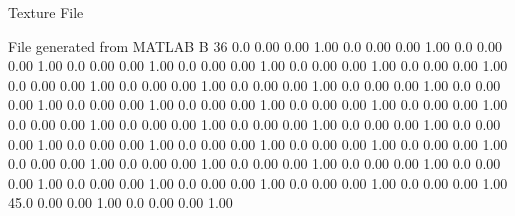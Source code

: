 Texture File

File generated from MATLAB
B 36
   0.0   0.00   0.00  1.00
   0.0   0.00   0.00  1.00
   0.0   0.00   0.00  1.00
   0.0   0.00   0.00  1.00
   0.0   0.00   0.00  1.00
   0.0   0.00   0.00  1.00
   0.0   0.00   0.00  1.00
   0.0   0.00   0.00  1.00
   0.0   0.00   0.00  1.00
   0.0   0.00   0.00  1.00
   0.0   0.00   0.00  1.00
   0.0   0.00   0.00  1.00
   0.0   0.00   0.00  1.00
   0.0   0.00   0.00  1.00
   0.0   0.00   0.00  1.00
   0.0   0.00   0.00  1.00
   0.0   0.00   0.00  1.00
   0.0   0.00   0.00  1.00
   0.0   0.00   0.00  1.00
   0.0   0.00   0.00  1.00
   0.0   0.00   0.00  1.00
   0.0   0.00   0.00  1.00
   0.0   0.00   0.00  1.00
   0.0   0.00   0.00  1.00
   0.0   0.00   0.00  1.00
   0.0   0.00   0.00  1.00
   0.0   0.00   0.00  1.00
   0.0   0.00   0.00  1.00
   0.0   0.00   0.00  1.00
   0.0   0.00   0.00  1.00
   0.0   0.00   0.00  1.00
   0.0   0.00   0.00  1.00
   0.0   0.00   0.00  1.00
   0.0   0.00   0.00  1.00
  45.0   0.00   0.00  1.00
   0.0   0.00   0.00  1.00
